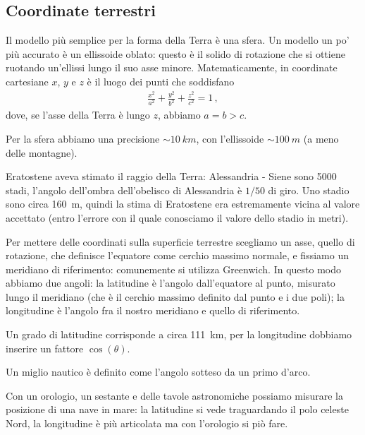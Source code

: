 \documentclass[main.tex]{subfiles}
\begin{document}
\subsection{Coordinate terrestri}


Il modello più semplice per la forma della Terra è una sfera.
Un modello un po' più accurato è un ellissoide oblato: questo è il solido di rotazione che si ottiene ruotando un'ellissi lungo il suo asse minore. Matematicamente, in coordinate cartesiane \(x\), \(y\) e \(z\) è il luogo dei punti che soddisfano 
%
\begin{align}
\frac{x^2}{a^2} + \frac{y^2}{b^2} + \frac{z^2}{c^2} = 1
\,,
\end{align}
%
dove, se l'asse della Terra è lungo \(z\), abbiamo \(a = b > c\).

Per la sfera abbiamo una precisione \(\sim \SI{10}{km}\), con l'ellissoide \(\sim \SI{100}{m}\) (a meno delle montagne).

Eratostene aveva stimato il raggio della Terra: Alessandria - Siene sono \num{5000} stadi, l'angolo dell'ombra dell'obelisco di Alessandria è \(1/50\) di giro. 
Uno stadio sono circa \SI{160}{m}, quindi la stima di Eratostene era estremamente vicina al valore accettato (entro l'errore con il quale conosciamo il valore dello stadio in metri).

Per mettere delle coordinati sulla superficie terrestre scegliamo un asse, quello di rotazione, che definisce l'equatore come cerchio massimo normale, e fissiamo un meridiano di riferimento: comunemente si utilizza Greenwich. 
In questo modo abbiamo due angoli: la latitudine è l'angolo dall'equatore al punto, misurato lungo il meridiano (che è il cerchio massimo definito dal punto e i due poli); la longitudine è l'angolo fra il nostro meridiano e quello di riferimento. 

Un grado di latitudine corrisponde a circa \SI{111}{km}, per la longitudine dobbiamo inserire un fattore \(\cos(\theta )\). 

Un miglio nautico è definito come l'angolo sotteso da un primo d'arco. 

Con un orologio, un sestante e delle tavole astronomiche possiamo misurare la posizione di una nave in mare: la latitudine si vede traguardando il polo celeste Nord, la longitudine è più articolata ma con l'orologio si piò fare.
\end{document}
